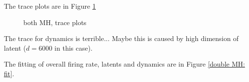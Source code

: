 \documentclass[]{article}
\begin{document}
The trace plots are in Figure \ref{double MH: trace}
\begin{figure}[h!]
	\caption{both MH, trace plots}
	\label{double MH: trace}
\end{figure}

The trace for dynamics is terrible... Maybe this is caused by high dimension of latent (\(d=6000\) in this case).

The fitting of overall firing rate, latents and dynamics are in Figure \ref{double MH: fit}.
\end{document}
